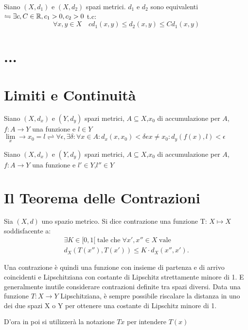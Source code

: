 Siano $(X,d_1)$ e $(X,d_2)$ spazi metrici. $d_1$ e $d_2$ sono equivalenti $\leftrightharpoons \exists c,C\in\mathbb{R}, c_1>0, c_2>0$ t.c:
$$ \forall x,y \in X\quad cd_1(x,y)\le d_2(x,y)\le Cd_1(x,y) $$


\section{...}
\section{Limiti e Continuità}
Siano $(X,d_x)$ e $(Y,d_y)$ spazi metrici, $A\subseteq{X}$,$x_0$ di accumulazione per $A$, $f:A\rightarrow{Y}$ una funzione e $l\in{Y}$ \\
$\lim\limits_x\rightarrow{x_0} = l \rightleftharpoons \forall{\epsilon},\exists\delta : \forall{x}\in A : d_x(x,x_0)<\delta e x\ne{x_0} : d_y(f(x),l)<\epsilon$

\proposition
Siano $(X,d_x)$ e $(Y,d_y)$ spazi metrici, $A\subseteq{X}$,$x_0$ di accumulazione per $A$, $f:A\rightarrow{Y}$ una funzione e $l'\in{Y}$,$l''\in{Y}$  \\

\section{Il Teorema delle Contrazioni}
\begin{definition}[Contrazione]
	\label{def:contrazione}
	Sia $(X, d)$ uno spazio metrico. Si dice contrazione una funzione T: $X \mapsto X$ soddisfacente a:
	\begin{align}
		\label{equaz:def_contrazione}
		\exists K \in [0, 1[\;\text{tale che}\;\forall x',x''\in X\;\text{vale}\\
		d_X(T(x''), T(x')) \le K \cdot d_X(x'', x').
	\end{align}


	Una contrazione è quindi una funzione con insieme di partenza e di arrivo coincidenti e
	Lipschitziana con costante di Lipschitz strettamente minore di 1.
	E generalmente inutile considerare contrazioni definite tra spazi diversi. Data una funzione
	$T: X\rightarrow Y$ Lipschitziana, è sempre possibile riscalare la distanza in uno dei due spazi X o Y
	per ottenere una costante di Lipschitz minore di 1.
	\begin{note}
		D'ora in poi si utilizzerà la notazione $Tx$ per intendere $T(x)$
	\end{note}
\end{definition}

